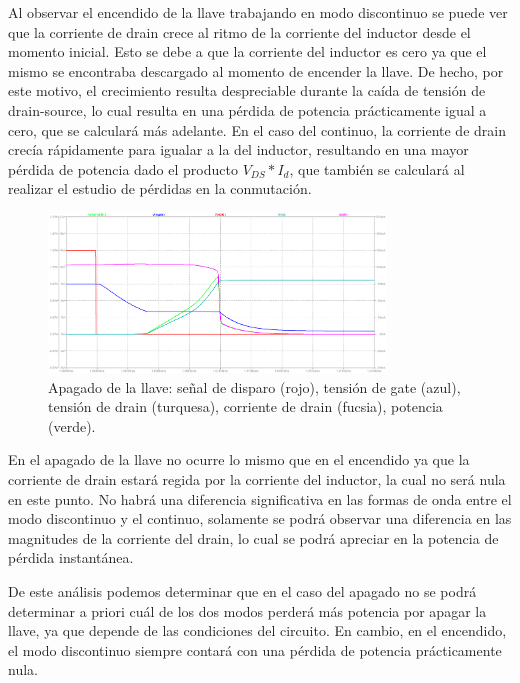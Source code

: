 \documentclass[e4_tp1_main.tex]{subfiles}
\begin{document}
	Al observar el encendido de la llave trabajando en modo discontinuo se puede ver que la corriente de drain crece al ritmo de la corriente del inductor desde el momento inicial. Esto se debe a que la corriente del inductor es cero ya que el mismo se encontraba descargado al momento de encender la llave. De hecho, por este motivo, el crecimiento resulta despreciable durante la caída de tensión de drain-source, lo cual resulta en una pérdida de potencia prácticamente igual a cero, que se calculará más adelante. En el caso del continuo, la corriente de drain crecía rápidamente para igualar a la del inductor, resultando en una mayor pérdida de potencia dado el producto $V_{DS}*I_d$, que también se calculará al realizar el estudio de pérdidas en la conmutación.
	
	\begin{figure}[H]
		\centering
		\includegraphics[width=0.8\textwidth]{images/ej4/fig2.png}
		\caption{Apagado de la llave: señal de disparo (rojo), tensi\'on de gate (azul), tensi\'on de drain (turquesa), corriente de drain (fucsia), potencia (verde).}
		\label{fig:my_label}
		
	\end{figure}
	
	En el apagado de la llave no ocurre lo mismo que en el encendido ya que la corriente de drain estará regida por la corriente del inductor, la cual no será nula en este punto. No habrá una diferencia significativa en las formas de onda entre el modo discontinuo y el continuo, solamente se podrá observar una diferencia en las magnitudes de la corriente del drain, lo cual  se podrá apreciar en la potencia de pérdida instantánea. 
	
	De este análisis podemos determinar que en el caso del apagado no se podrá determinar a priori cuál de los dos modos perderá más potencia por apagar la llave, ya que depende de las condiciones del circuito. En cambio, en el encendido, el modo discontinuo siempre contará con una pérdida de potencia prácticamente nula.
	
\end{document}
